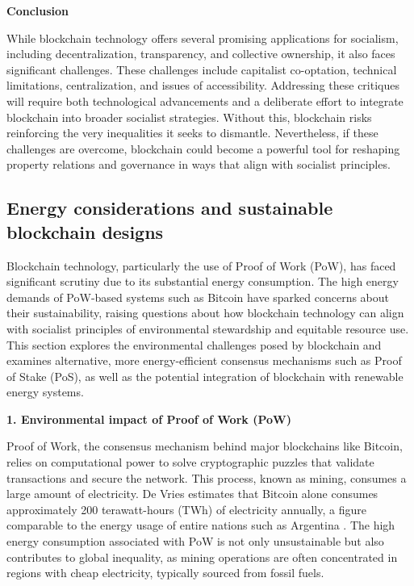 \begin{refsection}
\textbf{Conclusion}

While blockchain technology offers several promising applications for socialism, including decentralization, transparency, and collective ownership, it also faces significant challenges. These challenges include capitalist co-optation, technical limitations, centralization, and issues of accessibility. Addressing these critiques will require both technological advancements and a deliberate effort to integrate blockchain into broader socialist strategies. Without this, blockchain risks reinforcing the very inequalities it seeks to dismantle. Nevertheless, if these challenges are overcome, blockchain could become a powerful tool for reshaping property relations and governance in ways that align with socialist principles.

\subsection{Energy considerations and sustainable blockchain designs}

Blockchain technology, particularly the use of Proof of Work (PoW), has faced significant scrutiny due to its substantial energy consumption. The high energy demands of PoW-based systems such as Bitcoin have sparked concerns about their sustainability, raising questions about how blockchain technology can align with socialist principles of environmental stewardship and equitable resource use. This section explores the environmental challenges posed by blockchain and examines alternative, more energy-efficient consensus mechanisms such as Proof of Stake (PoS), as well as the potential integration of blockchain with renewable energy systems.

\textbf{1. Environmental impact of Proof of Work (PoW)}

Proof of Work, the consensus mechanism behind major blockchains like Bitcoin, relies on computational power to solve cryptographic puzzles that validate transactions and secure the network. This process, known as mining, consumes a large amount of electricity. De Vries estimates that Bitcoin alone consumes approximately 200 terawatt-hours (TWh) of electricity annually, a figure comparable to the energy usage of entire nations such as Argentina \cite[pp.~145-148]{de_vries2021}. The high energy consumption associated with PoW is not only unsustainable but also contributes to global inequality, as mining operations are often concentrated in regions with cheap electricity, typically sourced from fossil fuels.


\end{refsection}
